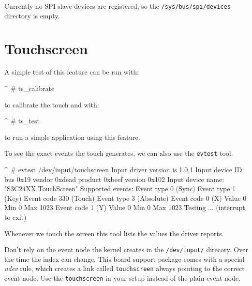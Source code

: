 \begin{important}
Currently no SPI slave devices are registered, so the
\texttt{/sys/bus/spi/devices} directory is empty.
\end{important}

%
%


\section{Touchscreen}					\label{sec:TOUCH}

A simple test of this feature can be run with:

\begin{ptxshell}[escapechar=|]{^}
# ts_calibrate
\end{ptxshell}

to calibrate the touch and with:

\begin{ptxshell}[escapechar=|]{^}
# ts_test
\end{ptxshell}

to run a simple application using this feature.

To see the exact events the touch generates, we can also use the
\texttt{evtest} tool.

\begin{ptxshell}[escapechar=|]{^}
# evtest /dev/input/touchscreen
Input driver version is 1.0.1
Input device ID: bus 0x19 vendor 0xdead product 0xbeef version 0x102
Input device name: "S3C24XX TouchScreen"
Supported events:
  Event type 0 (Sync)
  Event type 1 (Key)
    Event code 330 (Touch)
  Event type 3 (Absolute)
    Event code 0 (X)
     Value      0
     Min        0
     Max     1023
  Event code 1 (Y)
     Value      0
     Min        0
     Max     1023
Testing ... (interrupt to exit)
\end{ptxshell}

Whenever we touch the screen this tool lists the values the driver reports.

\begin{important}
Don't rely on the event node the kernel creates in the \texttt{/dev/input/}
direcory. Over the time the index can change. This board support package comes
with a special \textit{udev} rule, which creates a link called \texttt{touchscreen}
always pointing to the correct event node. Use the \texttt{touchscreen} in your
setup instead of the plain event node.
\end{important}


